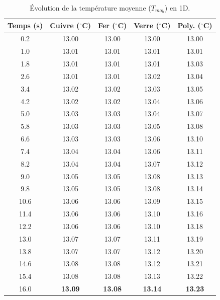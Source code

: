 \documentclass[a4paper,12pt]{article}
\begin{document}
\begin{table}[H]
    \centering
    \small
    \begin{tabular}{|c||c|c|c|c|}
        \hline
        \textbf{Temps (s)} & \textbf{Cuivre ($^\circ$C)} & \textbf{Fer ($^\circ$C)} & \textbf{Verre ($^\circ$C)} & \textbf{Poly. ($^\circ$C)} \\
        \hline \hline
        0.2  & 13.00 & 13.00 & 13.00 & 13.00 \\
        1.0  & 13.01 & 13.01 & 13.01 & 13.01 \\
        1.8  & 13.01 & 13.01 & 13.01 & 13.03 \\
        2.6  & 13.01 & 13.01 & 13.02 & 13.04 \\
        3.4  & 13.02 & 13.02 & 13.03 & 13.05 \\
        4.2  & 13.02 & 13.02 & 13.04 & 13.06 \\
        5.0  & 13.03 & 13.03 & 13.04 & 13.07 \\
        5.8  & 13.03 & 13.03 & 13.05 & 13.08 \\
        6.6  & 13.03 & 13.03 & 13.06 & 13.10 \\
        7.4  & 13.04 & 13.04 & 13.06 & 13.11 \\
        8.2  & 13.04 & 13.04 & 13.07 & 13.12 \\
        9.0  & 13.05 & 13.05 & 13.08 & 13.13 \\
        9.8  & 13.05 & 13.05 & 13.08 & 13.14 \\
        10.6 & 13.06 & 13.06 & 13.09 & 13.15 \\
        11.4 & 13.06 & 13.06 & 13.10 & 13.16 \\
        12.2 & 13.06 & 13.06 & 13.10 & 13.18 \\
        13.0 & 13.07 & 13.07 & 13.11 & 13.19 \\
        13.8 & 13.07 & 13.07 & 13.12 & 13.20 \\
        14.6 & 13.08 & 13.08 & 13.12 & 13.21 \\
        15.4 & 13.08 & 13.08 & 13.13 & 13.22 \\
        16.0 & \textbf{13.09} & \textbf{13.08} & \textbf{13.14} & \textbf{13.23} \\
        \hline
    \end{tabular}
    \caption{Évolution de la température moyenne ($T_{moy}$) en 1D.}
    \label{tab:comparaison_tmoy_1d}
\end{table}
\end{document}
